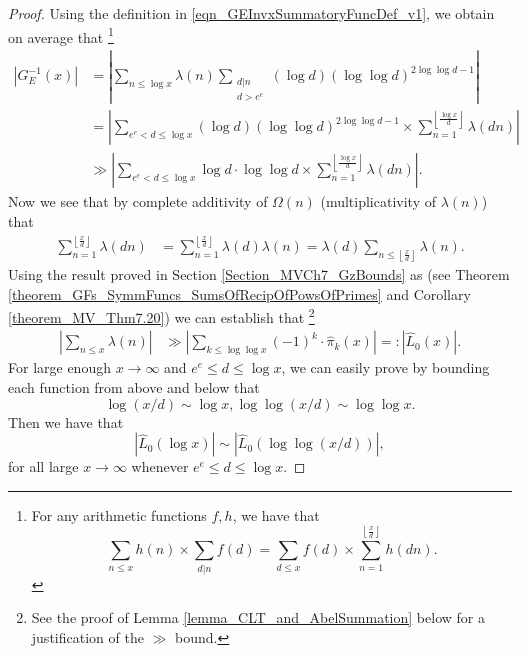\documentclass[11pt,reqno,a4letter]{article}
\numberwithin{figure}{section}
\numberwithin{table}{section}
\newcommand{\cf}{\textit{cf.\ }}
\newcommand{\Floor}[2]{\ensuremath{\left\lfloor \frac{#1}{#2} \right\rfloor}}
\theoremstyle{plain}
\numberwithin{theorem}{section}
\theoremstyle{definition}
\newcommand{\SuccSim}[0]{\overset{_{\scriptsize{\blacktriangle}}}{\succsim}}
\renewcommand{\SuccSim}[0]{\ensuremath{\gg}}
\begin{document}
\begin{proof} 
Using the definition in \eqref{eqn_GEInvxSummatoryFuncDef_v1}, we obtain on average that \footnote{ 
     For any arithmetic functions $f,h$, we have that \cite[\cf \S 3.10; \S 3.12]{APOSTOLANUMT} 
     \[
     \sum_{n \leq x} h(n) \times \sum_{d|n} f(d) = \sum_{d \leq x} f(d) \times \sum_{n=1}^{\Floor{x}{d}} h(dn). 
     \] 
}
\begin{align*} 
\left\lvert G_E^{-1}(x) \right\rvert & = 
     \left\lvert \sum_{n \leq \log x} \lambda(n) 
     \sum_{\substack{d|n \\ d > e^e}} (\log d) (\log\log d)^{2\log\log d - 1} \right\rvert \\ 
     & = \left\lvert \sum_{e^e < d \leq \log x} (\log d) (\log\log d)^{2\log\log d - 1} \times 
     \sum_{n=1}^{\Floor{\log x}{d}} \lambda(dn) \right\rvert \\ 
     & \SuccSim \left\lvert \sum_{e^e < d \leq \log x} \log d \cdot \log\log d \times 
     \sum_{n=1}^{\Floor{\log x}{d}} \lambda(dn) \right\rvert. 
\end{align*} 
Now we see that by complete additivity of $\Omega(n)$ 
(multiplicativity of $\lambda(n)$) that 
\begin{align*} 
\sum_{n=1}^{\Floor{x}{d}} \lambda(dn) & = \sum_{n=1}^{\Floor{x}{d}} \lambda(d) \lambda(n) 
     = \lambda(d) \sum_{n \leq \Floor{x}{d}} \lambda(n). 
\end{align*} 
Using the result proved in Section \ref{Section_MVCh7_GzBounds} as 
(see Theorem \ref{theorem_GFs_SymmFuncs_SumsOfRecipOfPowsOfPrimes} and 
Corollary \ref{theorem_MV_Thm7.20})
we can establish that \footnote{ 
     See the proof of Lemma \ref{lemma_CLT_and_AbelSummation} below for 
     a justification of the $\gg$ bound. 
}
\begin{align*} 
\left\lvert \sum_{n \leq x} \lambda(n) \right\rvert & \gg 
     \left\lvert \sum_{k \leq \log\log x} (-1)^k \cdot \widehat{\pi}_k(x) \right\rvert 
     =: \left\lvert \widehat{L}_0(x) \right\rvert. 
\end{align*} 
For large enough $x \rightarrow \infty$ and $e^e \leq d \leq \log x$, 
we can easily prove by bounding each function from above and below that 
\[
\log(x/d) \sim \log x, \log\log(x/d) \sim \log\log x.  
\] 
Then we have that 
$$\left\lvert \widehat{L}_0(\log x) \right\rvert \sim 
 \left\lvert \widehat{L}_0(\log\log (x/d)) \right\rvert,$$ 
for all large $x \rightarrow \infty$ whenever $e^e \leq d \leq \log x$. 


\end{proof}
\end{document}

